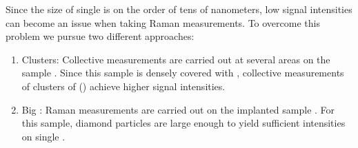 			Since the size of single \nds is on the order of tens of nanometers, low signal intensities can become an issue when taking Raman measurements.
			To overcome this problem we pursue two different approaches:
			\begin{enumerate}[label=\alph*),ref=\alph*)]
				\item \Nd Clusters: \label{item::raman_gband} Collective measurements are carried out at several areas on the sample \insituS. Since this sample is densely covered with \nds, collective measurements of clusters of \nds () achieve higher signal intensities.
				\item Big \Nds: \label{item::raman_implanted} Raman measurements are carried out on the implanted sample \implantedTao. For this sample, diamond particles are large enough to yield sufficient intensities on single \nds.
			\end{enumerate}

